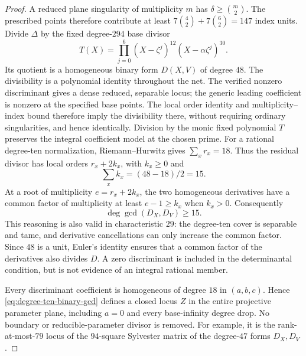 \begin{proof}
A reduced plane singularity of multiplicity $m$ has
$\delta\ge\binom m2$.  The prescribed points therefore contribute at
least $7\binom42+7\binom62=147$ index units.
Divide $\Delta$ by the fixed degree-$294$ base divisor
\[
 T(X)=\prod_{j=0}^6(X-\zeta^j)^{12}
                    (X-\alpha\zeta^j)^{30}.
\]
Its quotient is a homogeneous binary form $D(X,V)$ of degree $48$.
The divisibility is a polynomial identity throughout the net.
The verified nonzero discriminant gives a dense reduced, separable locus;
the generic leading coefficient is nonzero at the specified base points.
The local order identity and multiplicity--index bound therefore imply
the divisibility there, without requiring ordinary singularities, and
hence identically. Division by the monic fixed polynomial $T$ preserves
the integral coefficient model at the chosen prime.
For a rational degree-ten normalization, Riemann--Hurwitz gives
$\sum_xr_x=18$.  Thus the residual divisor has local orders
$r_x+2k_x$, with $k_x\ge0$ and
\[
 \sum_xk_x=(48-18)/2=15.
\]
At a root of multiplicity $e=r_x+2k_x$, the two homogeneous derivatives
have a common factor of multiplicity at least $e-1\ge k_x$ when
$k_x>0$.  Consequently
\begin{equation}\label{eq:degree-ten-binary-gcd}
 \deg\gcd(D_X,D_V)\ge15.
\end{equation}
This reasoning is also valid in characteristic $29$: the degree-ten
cover is separable and tame, and derivative cancellations can only
increase the common factor.  Since $48$ is a unit, Euler's identity
ensures that a common factor of the derivatives also divides $D$.
A zero discriminant is included in the determinantal condition, but is
not evidence of an integral rational member.

Every discriminant coefficient is homogeneous of degree $18$ in
$(a,b,c)$.  Hence \eqref{eq:degree-ten-binary-gcd} defines a closed locus
$Z$ in the entire projective parameter plane, including $a=0$ and every
base-infinity degree drop.  No boundary or reducible-parameter divisor
is removed.  For example, it is the rank-at-most-$79$ locus of the
$94$-square Sylvester matrix of the degree-$47$ forms $D_X,D_V$.


\end{proof}
